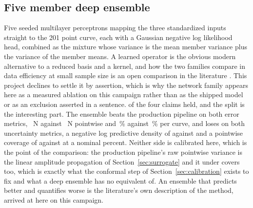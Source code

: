 \documentclass[11pt,a4paper]{article}
\begin{document}
\subsection{Five member deep ensemble}
Five seeded multilayer perceptrons mapping the three standardized inputs straight to the 201 point
curve, each with a Gaussian negative log likelihood head, combined as the mixture whose variance
is the mean member variance plus the variance of the member means. A learned operator is the
obvious modern alternative to a reduced basis and a kernel, and how the two families compare in
data efficiency at small sample size is an open comparison in the literature
\cite{westermann2026}. This project declines to settle it by assertion, which is why the network
family appears here as a measured ablation on this campaign rather than as the shipped model or
as an exclusion asserted in a sentence. \AblationThreeClaimsHeld{} of
the four claims held, and the split is the interesting part. The ensemble beats the production
pipeline on both error metrics, \AblationThreeRMSE~N against \AblationThreeProductionRMSE~N
pointwise and \AblationThreeForceLTwo\,\% against \CurveLTwoGP\,\% per curve, and loses on both
uncertainty metrics, a negative log predictive density of \AblationThreeNLPD{} against
\AblationThreeProductionNLPD{} and a pointwise coverage of \AblationThreeCoverage{} against
\AblationThreeProductionCoverage{} at a nominal \MCBandLevel{} percent. Neither side is calibrated
here, which is the point of the comparison: the production pipeline's raw pointwise variance is
the linear amplitude propagation of Section~\ref{sec:surrogate} and it under covers too, which is
exactly what the conformal step of Section~\ref{sec:calibration} exists to fix and what a deep
ensemble has no equivalent of. An ensemble that predicts better and quantifies worse is the
literature's own description of the method, arrived at here on this campaign.
\end{document}
